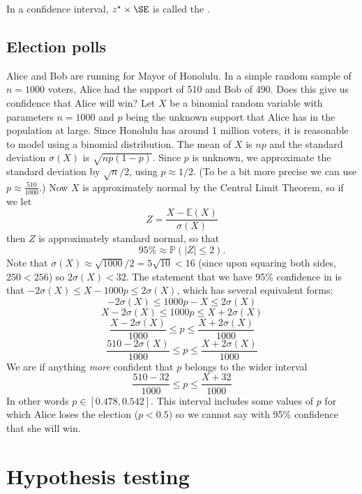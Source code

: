 \begin{termBox}{
\label{marginOfErrorTermBox}In a confidence interval, $z^{\star}\times \SE$ is called the .}
\end{termBox}


\subsection{Election polls}\label{oct-24-2025}
Alice and Bob are running for Mayor of Honolulu.
In a simple random sample of $n=1000$ voters, Alice had the support of 510 and Bob of 490.
Does this give us confidence that Alice will win?
Let $X$ be a binomial random variable with parameters $n=1000$ and $p$ being the unknown support that Alice has
in the population at large. Since Honolulu has around 1 million voters, it is reasonable to model using a binomial distribution.
The mean of $X$ is $np$ and the standard deviation $\sigma(X)$ is $\sqrt{np(1-p)}$. Since $p$ is unknown, we approximate the standard deviation by $\sqrt{n}/2$, using $p\approx 1/2$. (To be a bit more precise we can use $p\approx \frac{510}{1000}$.)
Now $X$ is approximately normal by the Central Limit Theorem, so if we let 
\[
Z = \frac{X - \mathbb E(X)}{\sigma(X)}
\]
then $Z$ is approximately standard normal, so that
\[
95\% \approx \mathbb P(|Z|\le 2).
\]
Note that $\sigma(X)\approx \sqrt{1000}/2=5\sqrt{10}<16$ (since upon squaring both sides, $250<256$)
so $2\sigma(X)<32$.
The statement that we have 95\% confidence in is that $-2\sigma(X) \le X-1000p \le 2\sigma(X)$,
which has several equivalent forms:
\[-2\sigma(X) \le 1000p-X \le 2\sigma(X)\]
\[X-2\sigma(X) \le 1000p \le X+2\sigma(X)\]
\[\frac{X-2\sigma(X)}{1000} \le p \le \frac{X+2\sigma(X)}{1000}\]
\[\frac{510-2\sigma(X)}{1000} \le p \le \frac{X+2\sigma(X)}{1000}\]
We are if anything \emph{more} confident that $p$ belongs to the wider interval
\[\frac{510-32}{1000} \le p \le \frac{X+32}{1000}\]
In other words $p \in [0.478, 0.542]$. This interval includes some values of $p$ for which Alice loses the election ($p<0.5$)
so we cannot say with 95\% confidence that she will win.
\section{Hypothesis testing}
\label{hypothesisTesting}



